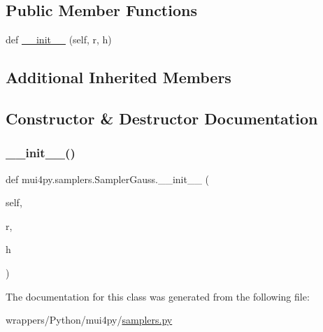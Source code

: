 \subsection*{Public Member Functions}
\begin{DoxyCompactItemize}
\item 
def \hyperlink{classmui4py_1_1samplers_1_1_sampler_gauss_a191b13801f6e95238480ac0ddc8027ec}{\+\_\+\+\_\+init\+\_\+\+\_\+} (self, r, h)
\end{DoxyCompactItemize}
\subsection*{Additional Inherited Members}


\subsection{Constructor \& Destructor Documentation}
\mbox{\label{classmui4py_1_1samplers_1_1_sampler_gauss_a191b13801f6e95238480ac0ddc8027ec}} 
\subsubsection{\texorpdfstring{\+\_\+\+\_\+init\+\_\+\+\_\+()}{\_\_init\_\_()}}
{\footnotesize\ttfamily def mui4py.\+samplers.\+Sampler\+Gauss.\+\_\+\+\_\+init\+\_\+\+\_\+ (\begin{DoxyParamCaption}\item[{}]{self,  }\item[{}]{r,  }\item[{}]{h }\end{DoxyParamCaption})}



The documentation for this class was generated from the following file\+:\begin{DoxyCompactItemize}
\item 
wrappers/\+Python/mui4py/\hyperlink{samplers_8py}{samplers.\+py}\end{DoxyCompactItemize}
